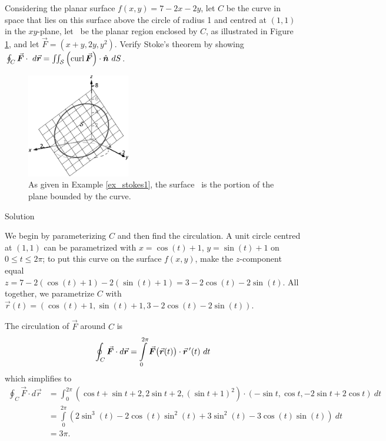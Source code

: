 \begin{example}
\label{ex_stokes1}
Considering the planar surface $f(x,y) = 7-2x-2y$, let $C$ be the curve in space that lies on this surface above the circle of radius 1 and centred at $(1,1)$ in the $xy$-plane, let \surfaceS\ be the planar region enclosed by $C$, as illustrated in Figure \ref{fig_Vector_Calc_31}, and let $\vec F = \left( x+y,2y, y^2\right)$. Verify Stoke's theorem by showing $\oint_C \vec F\cdot \ d\vec r = \iint_\surfaceS \left(\curl \vec F\right)\cdot \hat n\ dS$.

\begin{figure}[H]
	\begin{center}
			\includegraphics[width=0.4\textwidth]{fig_Vector_Calc_31}
	\caption{As given in Example \ref{ex_stokes1}, the surface \surfaceS\ is the portion of the plane bounded by the curve.}
	\label{fig_Vector_Calc_31}
	\end{center}
\end{figure}



Solution 


We begin by parameterizing $C$ and then find the circulation. A unit circle centred at $(1,1)$ can be parametrized with $x=\cos (t)+1$, $y=\sin (t)+1$ on $0\leq t\leq 2\pi$; to put this curve on the surface $f(x,y)$, make the $z$-component equal $ z= 7-2\left(\cos (t)+1\right)-2\left(\sin (t)+1\right)  = 3-2\cos (t) - 2\sin (t)$. All together, we parametrize $C$ with $\vec r(t) = \left( \cos (t)+1, \sin (t)+1, 3-2\cos (t)-2\sin (t)\right)$. 


The circulation of $\vec F$ around $C$ is
$$
\oint_C\vec F\cdot d\vec r = \int\limits_0^{2\pi}\vec F\big(\vec r(t)\big)\cdot \vrp(t)\ dt
$$
which simplifies to
\begin{align*}
\oint_C\vec F\cdot d\vec r &= \int_0^{2\pi} \left(\cos t+\sin t+2, 2\sin t+2, (\sin t+1)^2\right)\cdot \left( -\sin t,\cos t, -2\sin t+2\cos t\right)\ dt \\
	&= \int\limits_0^{2\pi}\left(2\sin^3(t)-2\cos (t)\sin^2(t)+3\sin^2(t)-3\cos (t)\sin (t)\right)\ dt \\
	&= 3\pi.
	\end{align*}


\end{example}
